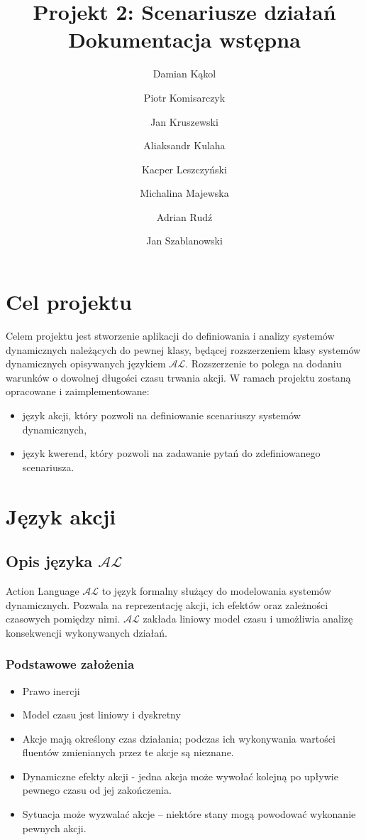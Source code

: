 \documentclass{article}
\title{Projekt 2: Scenariusze działań \\ \large{Dokumentacja wstępna}}
\author{Damian Kąkol
	\and Piotr Komisarczyk
	\and Jan Kruszewski
	\and Aliaksandr Kulaha
	\and Kacper Leszczyński
	\and Michalina Majewska
	\and Adrian Rudź
	\and Jan Szablanowski}
\begin{document}
\maketitle
\tableofcontents

\newpage

\section{Cel projektu}
Celem projektu jest stworzenie aplikacji do definiowania i analizy systemów dynamicznych należących do pewnej klasy, będącej rozszerzeniem klasy systemów dynamicznych opisywanych językiem $\mathcal{AL}$.
Rozszerzenie to polega na dodaniu warunków o dowolnej długości czasu trwania akcji. W ramach projektu zostaną opracowane i zaimplementowane:
\begin{itemize}
	\item język akcji, który pozwoli na definiowanie scenariuszy systemów dynamicznych,
	\item język kwerend, który pozwoli na zadawanie pytań do zdefiniowanego scenariusza.
\end{itemize}	


\section{Język akcji}

\subsection{Opis języka $\mathcal{AL}$}
\label{sec:opis-jezyka-al}

Action Language $\mathcal{AL}$ to język formalny służący do modelowania systemów dynamicznych. Pozwala na reprezentację akcji, ich efektów oraz zależności czasowych pomiędzy nimi. $\mathcal{AL}$ zakłada liniowy model czasu i umożliwia analizę konsekwencji wykonywanych działań.

\subsubsection{Podstawowe założenia}
\begin{itemize}
    \item Prawo inercji
    \item Model czasu jest liniowy i dyskretny
    \item Akcje mają określony czas działania; podczas ich wykonywania wartości fluentów zmienianych przez te akcje są nieznane.
    \item Dynamiczne efekty akcji - jedna akcja może wywołać kolejną po upływie pewnego czasu od jej zakończenia.
    \item Sytuacja może wyzwalać akcje – niektóre stany mogą powodować wykonanie pewnych akcji.
\end{itemize}
\end{document}
